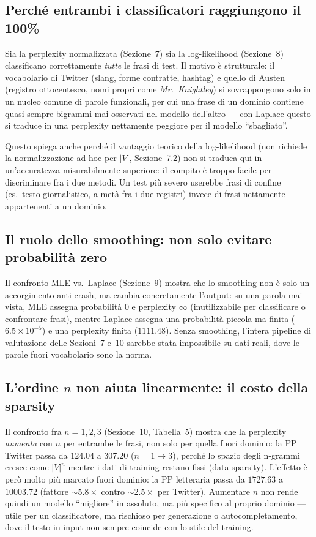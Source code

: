 ﻿\documentclass[12pt,a4paper]{article}
\begin{document}
\subsection{Perché entrambi i classificatori raggiungono il 100\%}

Sia la perplexity normalizzata (Sezione~7) sia la log-likelihood (Sezione~8) classificano correttamente \emph{tutte} le frasi di test. Il motivo è strutturale: il vocabolario di Twitter (slang, forme contratte, hashtag) e quello di Austen (registro ottocentesco, nomi propri come \textit{Mr.\ Knightley}) si sovrappongono solo in un nucleo comune di parole funzionali, per cui una frase di un dominio contiene quasi sempre bigrammi mai osservati nel modello dell'altro — con Laplace questo si traduce in una perplexity nettamente peggiore per il modello ``sbagliato''.

Questo spiega anche perché il vantaggio teorico della log-likelihood (non richiede la normalizzazione ad hoc per $|V|$, Sezione~7.2) non si traduca qui in un'accuratezza misurabilmente superiore: il compito è troppo facile per discriminare fra i due metodi. Un test più severo userebbe frasi di confine (es.\ testo giornalistico, a metà fra i due registri) invece di frasi nettamente appartenenti a un dominio.

\subsection{Il ruolo dello smoothing: non solo evitare probabilità zero}

Il confronto MLE vs.\ Laplace (Sezione~9) mostra che lo smoothing non è solo un accorgimento anti-crash, ma cambia concretamente l'output: su una parola mai vista, MLE assegna probabilità $0$ e perplexity $\infty$ (inutilizzabile per classificare o confrontare frasi), mentre Laplace assegna una probabilità piccola ma finita ($6.5 \times 10^{-5}$) e una perplexity finita ($1111.48$). Senza smoothing, l'intera pipeline di valutazione delle Sezioni~7 e~10 sarebbe stata impossibile su dati reali, dove le parole fuori vocabolario sono la norma.

\subsection{L'ordine $n$ non aiuta linearmente: il costo della sparsity}

Il confronto fra $n=1,2,3$ (Sezione~10, Tabella~5) mostra che la perplexity \emph{aumenta} con $n$ per entrambe le frasi, non solo per quella fuori dominio: la PP Twitter passa da $124.04$ a $307.20$ ($n{=}1\to3$), perché lo spazio degli n-grammi cresce come $|V|^n$ mentre i dati di training restano fissi (data sparsity). L'effetto è però molto più marcato fuori dominio: la PP letteraria passa da $1727.63$ a $10003.72$ (fattore $\sim5.8\times$ contro $\sim2.5\times$ per Twitter). Aumentare $n$ non rende quindi un modello ``migliore'' in assoluto, ma più specifico al proprio dominio — utile per un classificatore, ma rischioso per generazione o autocompletamento, dove il testo in input non sempre coincide con lo stile del training.
\end{document}
